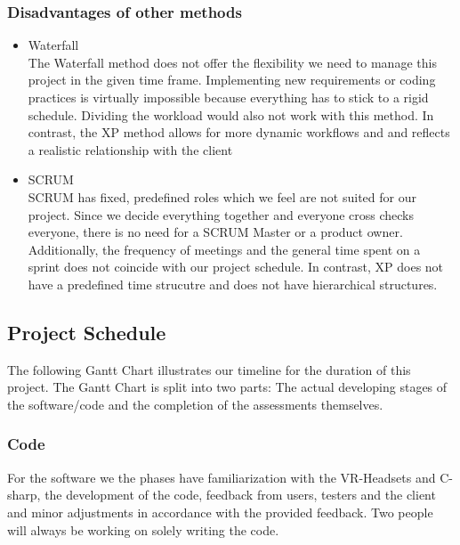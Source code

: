 \documentclass[coverpage,lineno]{../custom}
\begin{document}
\subsubsection{Disadvantages of other methods}
\begin{itemize}
    \item Waterfall \\
    The Waterfall method does not offer the flexibility we need to manage this project in the given time frame. Implementing new requirements or coding practices is virtually impossible because everything has to stick to a rigid schedule. Dividing the workload would also not work with this method. In contrast, the XP method allows for more dynamic workflows and and reflects a realistic relationship with the client
    \item SCRUM \\
    SCRUM has fixed, predefined roles which we feel are not suited for our project. Since we decide everything together and everyone cross checks everyone, there is no need for a SCRUM Master or a product owner. Additionally, the frequency of meetings and the general time spent on a sprint does not coincide with our project schedule. In contrast, XP does not have a predefined time strucutre and does not have hierarchical structures.   
    
    
\end{itemize}

\subsection{Project Schedule}
\label{ssec:schedule}

The following Gantt Chart illustrates our timeline for the duration of this project. The Gantt Chart is split into two parts: The actual developing stages of the software/code and the completion of the assessments themselves. 
\subsubsection{Code}
For the software we the phases have familiarization with the VR-Headsets and C-sharp, the development of the code, feedback from users, testers and the client and minor adjustments in accordance with the provided feedback. Two people will always be working on solely writing the code. 
\end{document}
